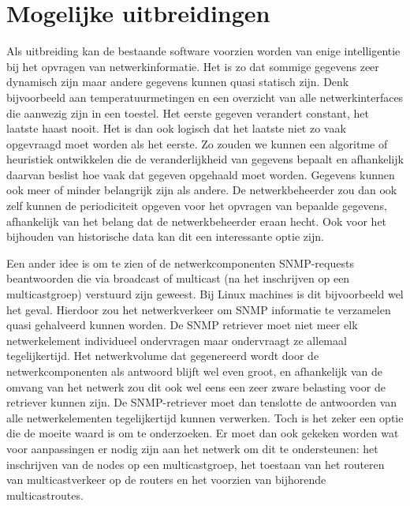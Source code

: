\section{Mogelijke uitbreidingen}
Als uitbreiding kan de bestaande software voorzien worden van enige intelligentie bij het opvragen van netwerkinformatie.
Het is zo dat sommige gegevens zeer dynamisch zijn maar andere gegevens kunnen quasi statisch zijn.
Denk bijvoorbeeld aan temperatuurmetingen en een overzicht van alle netwerkinterfaces die aanwezig zijn in een toestel.
Het eerste gegeven verandert constant, het laatste haast nooit.
Het is dan ook logisch dat het laatste niet zo vaak opgevraagd moet worden als het eerste.
Zo zouden we kunnen een algoritme of heuristiek ontwikkelen die de veranderlijkheid van gegevens bepaalt en afhankelijk daarvan
beslist hoe vaak dat gegeven opgehaald moet worden.
Gegevens kunnen ook meer of minder belangrijk zijn als andere.
De netwerkbeheerder zou dan ook zelf kunnen de periodiciteit opgeven voor het opvragen van bepaalde gegevens,
afhankelijk van het belang dat de netwerkbeheerder eraan hecht.
Ook voor het bijhouden van historische data kan dit een interessante optie zijn.

Een ander idee is om te zien of de netwerkcomponenten SNMP-requests beantwoorden die via broadcast of
multicast (na het inschrijven op een multicastgroep) verstuurd zijn geweest.
Bij Linux machines is dit bijvoorbeeld wel het geval.
Hierdoor zou het netwerkverkeer om SNMP informatie te verzamelen quasi gehalveerd kunnen worden.
De SNMP retriever moet niet meer elk netwerkelement individueel ondervragen maar ondervraagt ze allemaal tegelijkertijd.
Het netwerkvolume dat gegenereerd wordt door de netwerkcomponenten als antwoord blijft wel even groot,
en afhankelijk van de omvang van het netwerk zou dit ook wel eens een zeer zware belasting voor de retriever kunnen zijn.
De SNMP-retriever moet dan tenslotte de antwoorden van alle netwerkelementen tegelijkertijd kunnen verwerken. %
Toch is het zeker een optie die de moeite waard is om te onderzoeken.
Er moet dan ook gekeken worden wat voor aanpassingen er nodig zijn aan het netwerk om dit te ondersteunen:
het inschrijven van de nodes op een multicastgroep, het toestaan van het routeren van multicastverkeer op de routers en het voorzien van bijhorende multicastroutes.
